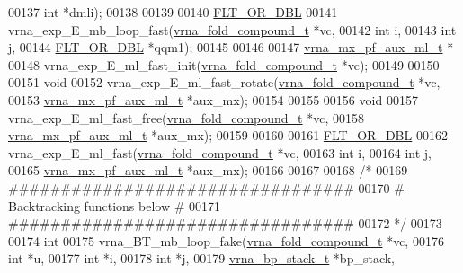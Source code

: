 \begin{DoxyCode}
00137                      \textcolor{keywordtype}{int}                  *dmli);
00138 
00139 
00140 \hyperlink{group__data__structures_ga31125aeace516926bf7f251f759b6126}{FLT\_OR\_DBL}
00141 vrna\_exp\_E\_mb\_loop\_fast(\hyperlink{group__fold__compound_structvrna__fc__s}{vrna\_fold\_compound\_t}  *vc,
00142                         \textcolor{keywordtype}{int}                   i,
00143                         \textcolor{keywordtype}{int}                   j,
00144                         \hyperlink{group__data__structures_ga31125aeace516926bf7f251f759b6126}{FLT\_OR\_DBL}            *qqm1);
00145 
00146 
00147 \hyperlink{group__loops_structvrna__mx__pf__aux__ml__t}{vrna\_mx\_pf\_aux\_ml\_t} *
00148 vrna\_exp\_E\_ml\_fast\_init(\hyperlink{group__fold__compound_structvrna__fc__s}{vrna\_fold\_compound\_t} *vc);
00149 
00150 
00151 \textcolor{keywordtype}{void}
00152 vrna\_exp\_E\_ml\_fast\_rotate(\hyperlink{group__fold__compound_structvrna__fc__s}{vrna\_fold\_compound\_t}  *vc,
00153                           \hyperlink{group__loops_structvrna__mx__pf__aux__ml__t}{vrna\_mx\_pf\_aux\_ml\_t}   *aux\_mx);
00154 
00155 
00156 \textcolor{keywordtype}{void}
00157 vrna\_exp\_E\_ml\_fast\_free(\hyperlink{group__fold__compound_structvrna__fc__s}{vrna\_fold\_compound\_t}  *vc,
00158                         \hyperlink{group__loops_structvrna__mx__pf__aux__ml__t}{vrna\_mx\_pf\_aux\_ml\_t}   *aux\_mx);
00159 
00160 
00161 \hyperlink{group__data__structures_ga31125aeace516926bf7f251f759b6126}{FLT\_OR\_DBL}
00162 vrna\_exp\_E\_ml\_fast(\hyperlink{group__fold__compound_structvrna__fc__s}{vrna\_fold\_compound\_t} *vc,
00163                    \textcolor{keywordtype}{int}                  i,
00164                    \textcolor{keywordtype}{int}                  j,
00165                    \hyperlink{group__loops_structvrna__mx__pf__aux__ml__t}{vrna\_mx\_pf\_aux\_ml\_t}  *aux\_mx);
00166 
00167 
00168 \textcolor{comment}{/*}
00169 \textcolor{comment}{ #################################}
00170 \textcolor{comment}{ # Backtracking functions below  #}
00171 \textcolor{comment}{ #################################}
00172 \textcolor{comment}{ */}
00173 
00174 \textcolor{keywordtype}{int}
00175 vrna\_BT\_mb\_loop\_fake(\hyperlink{group__fold__compound_structvrna__fc__s}{vrna\_fold\_compound\_t} *vc,
00176                      \textcolor{keywordtype}{int}                  *u,
00177                      \textcolor{keywordtype}{int}                  *i,
00178                      \textcolor{keywordtype}{int}                  *j,
00179                      \hyperlink{group__data__structures_structvrna__bp__stack__s}{vrna\_bp\_stack\_t}      *bp\_stack,

\end{DoxyCode}
